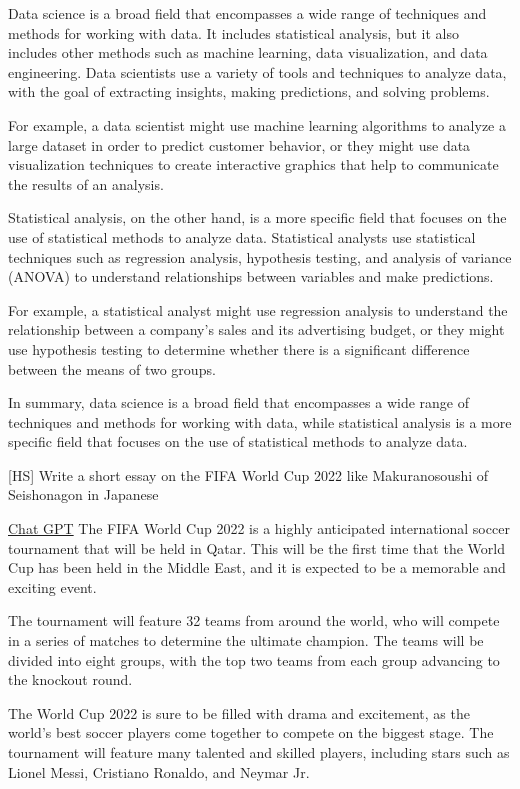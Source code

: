 \documentclass[
]{book}
\theoremstyle{definition}
\theoremstyle{definition}
\theoremstyle{definition}
\theoremstyle{definition}
\theoremstyle{remark}
\begin{document}
Data science is a broad field that encompasses a wide range of techniques and methods for working with data. It includes statistical analysis, but it also includes other methods such as machine learning, data visualization, and data engineering. Data scientists use a variety of tools and techniques to analyze data, with the goal of extracting insights, making predictions, and solving problems.

For example, a data scientist might use machine learning algorithms to analyze a large dataset in order to predict customer behavior, or they might use data visualization techniques to create interactive graphics that help to communicate the results of an analysis.

Statistical analysis, on the other hand, is a more specific field that focuses on the use of statistical methods to analyze data. Statistical analysts use statistical techniques such as regression analysis, hypothesis testing, and analysis of variance (ANOVA) to understand relationships between variables and make predictions.

For example, a statistical analyst might use regression analysis to understand the relationship between a company's sales and its advertising budget, or they might use hypothesis testing to determine whether there is a significant difference between the means of two groups.

In summary, data science is a broad field that encompasses a wide range of techniques and methods for working with data, while statistical analysis is a more specific field that focuses on the use of statistical methods to analyze data.

{[}HS{]} Write a short essay on the FIFA World Cup 2022 like Makuranosoushi of Seishonagon in Japanese

\protect\hyperlink{chatgpt}{Chat GPT} The FIFA World Cup 2022 is a highly anticipated international soccer tournament that will be held in Qatar. This will be the first time that the World Cup has been held in the Middle East, and it is expected to be a memorable and exciting event.

The tournament will feature 32 teams from around the world, who will compete in a series of matches to determine the ultimate champion. The teams will be divided into eight groups, with the top two teams from each group advancing to the knockout round.

The World Cup 2022 is sure to be filled with drama and excitement, as the world's best soccer players come together to compete on the biggest stage. The tournament will feature many talented and skilled players, including stars such as Lionel Messi, Cristiano Ronaldo, and Neymar Jr.
\end{document}
